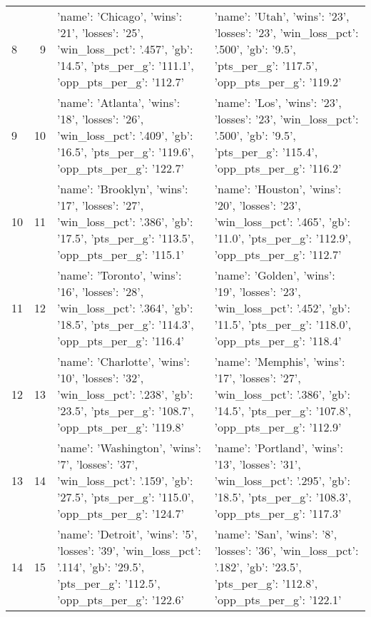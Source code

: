 \begin{tabular}{lrll}
8 & 9 & {'name': 'Chicago', 'wins': '21', 'losses': '25', 'win_loss_pct': '.457', 'gb': '14.5', 'pts_per_g': '111.1', 'opp_pts_per_g': '112.7'} & {'name': 'Utah', 'wins': '23', 'losses': '23', 'win_loss_pct': '.500', 'gb': '9.5', 'pts_per_g': '117.5', 'opp_pts_per_g': '119.2'} \\
9 & 10 & {'name': 'Atlanta', 'wins': '18', 'losses': '26', 'win_loss_pct': '.409', 'gb': '16.5', 'pts_per_g': '119.6', 'opp_pts_per_g': '122.7'} & {'name': 'Los', 'wins': '23', 'losses': '23', 'win_loss_pct': '.500', 'gb': '9.5', 'pts_per_g': '115.4', 'opp_pts_per_g': '116.2'} \\
10 & 11 & {'name': 'Brooklyn', 'wins': '17', 'losses': '27', 'win_loss_pct': '.386', 'gb': '17.5', 'pts_per_g': '113.5', 'opp_pts_per_g': '115.1'} & {'name': 'Houston', 'wins': '20', 'losses': '23', 'win_loss_pct': '.465', 'gb': '11.0', 'pts_per_g': '112.9', 'opp_pts_per_g': '112.7'} \\
11 & 12 & {'name': 'Toronto', 'wins': '16', 'losses': '28', 'win_loss_pct': '.364', 'gb': '18.5', 'pts_per_g': '114.3', 'opp_pts_per_g': '116.4'} & {'name': 'Golden', 'wins': '19', 'losses': '23', 'win_loss_pct': '.452', 'gb': '11.5', 'pts_per_g': '118.0', 'opp_pts_per_g': '118.4'} \\
12 & 13 & {'name': 'Charlotte', 'wins': '10', 'losses': '32', 'win_loss_pct': '.238', 'gb': '23.5', 'pts_per_g': '108.7', 'opp_pts_per_g': '119.8'} & {'name': 'Memphis', 'wins': '17', 'losses': '27', 'win_loss_pct': '.386', 'gb': '14.5', 'pts_per_g': '107.8', 'opp_pts_per_g': '112.9'} \\
13 & 14 & {'name': 'Washington', 'wins': '7', 'losses': '37', 'win_loss_pct': '.159', 'gb': '27.5', 'pts_per_g': '115.0', 'opp_pts_per_g': '124.7'} & {'name': 'Portland', 'wins': '13', 'losses': '31', 'win_loss_pct': '.295', 'gb': '18.5', 'pts_per_g': '108.3', 'opp_pts_per_g': '117.3'} \\
14 & 15 & {'name': 'Detroit', 'wins': '5', 'losses': '39', 'win_loss_pct': '.114', 'gb': '29.5', 'pts_per_g': '112.5', 'opp_pts_per_g': '122.6'} & {'name': 'San', 'wins': '8', 'losses': '36', 'win_loss_pct': '.182', 'gb': '23.5', 'pts_per_g': '112.8', 'opp_pts_per_g': '122.1'} \\
\end{tabular}


